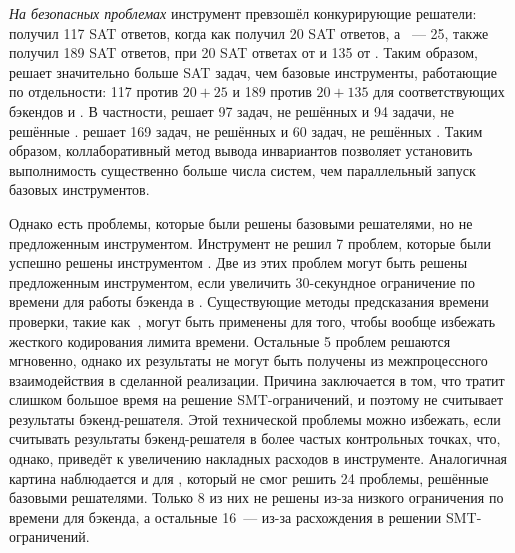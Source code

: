 \textit{На безопасных проблемах} инструмент \theringenCICI{} превзошёл конкурирующие решатели: \ringenCICI{\cvc{}} получил 117 SAT ответов, когда как \racer{} получил 20 SAT ответов, а \ringen{\cvc{}}~--- 25, также \ringenCICI{\vampire{}} получил 189 SAT ответов, при 20 SAT ответах от \racer{} и 135 от \ringen{\vampire{}}. 
Таким образом, \theringenCICI{} решает значительно больше SAT задач, чем базовые инструменты, работающие по отдельности: 117 против $20+25$ и 189 против $20+135$ для соответствующих бэкендов \cvc{} и \vampire{}.
В частности, \ringenCICI{\cvc{}} решает 97 задач, не решённых \racer{} и 94 задачи, не решённые \ringen{\cvc{}}.
\ringenCICI{\vampire{}} решает 169 задач, не решённых \racer{} и 60 задач, не решённых \ringen{\vampire{}}.
Таким образом, коллаборативный метод вывода инвариантов позволяет установить выполнимость существенно больше числа систем, чем параллельный запуск базовых инструментов.

Однако есть проблемы, которые были решены базовыми решателями, но не предложенным инструментом. Инструмент \ringenCICI{\cvc{}} не решил 7 проблем, которые были успешно решены инструментом \ringen{\cvc{}}. Две из этих проблем могут быть решены предложенным инструментом, если увеличить 30-секундное ограничение по времени для работы бэкенда в \theringenCICI{}. Существующие методы предсказания времени проверки, такие как~\cite{10.1145/3121257.3121262}, могут быть применены для того, чтобы вообще избежать жесткого кодирования лимита времени. Остальные 5 проблем решаются мгновенно, однако их результаты не могут быть получены из межпроцессного взаимодействия в сделанной реализации. Причина заключается в том, что \racer{} тратит слишком большое время на решение SMT-ограничений, и поэтому не считывает результаты бэкенд-решателя. Этой технической проблемы можно избежать, если считывать результаты бэкенд-решателя в более частых контрольных точках, что, однако, приведёт к увеличению накладных расходов в инструменте. Аналогичная картина наблюдается и для \ringenCICI{\vampire{}}, который не смог решить 24 проблемы, решённые базовыми решателями. Только 8 из них не решены из-за низкого ограничения по времени для бэкенда, а остальные 16~--- из-за расхождения \racer{} в решении SMT-ограничений.

